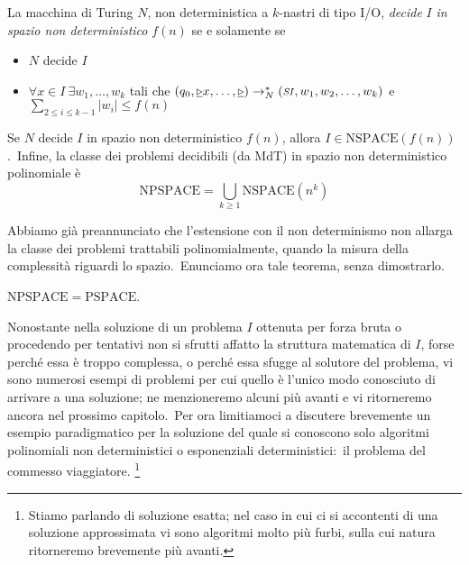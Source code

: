 \begin{definition}
    La macchina di Turing $N$, non deterministica a $k$-nastri di tipo I/O, \textit{decide} $I$ \textit{in spazio non deterministico} $f(n)$ se e solamente se
    \begin{itemize}
        \itemsep0px
        \item $N$ decide $I$
        \item $\forall x \in I\ \exists w_1,\dots,w_k$ tali che $(q_0, \underline{\triangleright} x, \dots,\underline{\triangleright}) \rightarrow^*_N (\mbox{\textit{\footnotesize SI}}, w_1,w_2,\dots,w_k)$ e $\sum_{2\leq i \leq k-1} |w_i| \leq f(n)$
    \end{itemize}
    Se $N$ decide $I$ in spazio non deterministico $f(n)$, allora $I \in \mathrm{NSPACE}(f(n))$.\
    Infine, la classe dei problemi decidibili (da MdT) in spazio non deterministico polinomiale è
    \[\mathrm{NPSPACE} = \bigcup_{k \geq 1} \mathrm{NSPACE}\left(n^k\right)\]

\end{definition}

\noindent Abbiamo già preannunciato che l'estensione con il non determinismo non allarga la classe dei problemi trattabili polinomialmente, quando la misura della complessità riguardi lo spazio.\
Enunciamo ora tale teorema, senza dimostrarlo.\

\begin{theorem} [Savitch]
    $\mathrm{NPSPACE} = \mathrm{PSPACE}$.
\end{theorem}

\noindent Nonostante nella soluzione di un problema $I$ ottenuta per forza bruta o procedendo per tentativi non si sfrutti affatto la struttura matematica di $I$, forse perché essa è troppo complessa, o perché essa sfugge al solutore del problema, vi sono numerosi esempi di problemi per cui quello è l'unico modo conosciuto di arrivare a una soluzione; ne menzioneremo alcuni più avanti e vi ritorneremo ancora nel prossimo capitolo.\
Per ora limitiamoci a discutere brevemente un esempio paradigmatico per la soluzione del quale si conoscono solo algoritmi polinomiali non deterministici o esponenziali deterministici:\ il problema del commesso viaggiatore.
\footnote{Stiamo parlando di soluzione esatta; nel caso in cui ci si accontenti di una soluzione approssimata vi sono algoritmi molto più furbi, sulla cui natura ritorneremo brevemente più avanti.}

